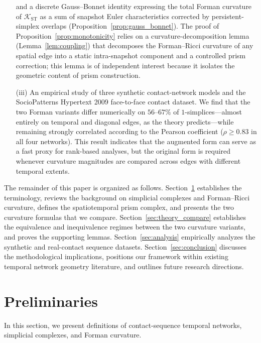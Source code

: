 \documentclass[
    pre,
    twocolumn,
    superscriptaddress,
    showpacs,
    nofootinbib,
    amsmath,
    amssymb,
    floatfix
]{revtex4-2}
\newcommand{\K}{\mathcal{K}}
\theoremstyle{plain} %
\theoremstyle{definition} %
\begin{document}
\begin{itemize}
      and a discrete Gauss--Bonnet identity expressing the total Forman curvature of $\K_{\mathrm{ST}}$ as a sum of snapshot Euler characteristics corrected by persistent-simplex overlaps (Proposition~\ref{prop:gauss_bonnet}).
      The proof of Proposition~\ref{prop:monotonicity} relies on a curvature-decomposition lemma (Lemma~\ref{lem:coupling}) that decomposes the Forman--Ricci curvature of any spatial edge into a static intra-snapshot component and a controlled prism correction; this lemma is of independent interest because it isolates the geometric content of prism construction.
\item[(iii)] An empirical study of three synthetic contact-network
      models and the SocioPatterns Hypertext 2009 face-to-face
      contact dataset.  We find that the two Forman variants differ
      numerically on $56$--$67\%$ of $1$-simplices---almost entirely
      on temporal and diagonal edges, as the theory predicts---while remaining strongly correlated according to the Pearson coefficient
      ($\rho\geq 0.83$ in all four networks).  This result indicates that
      the augmented form can serve as a fast proxy for rank-based
      analyses, but the original form is required whenever curvature magnitudes are compared across
      edges with different temporal extents.
\end{itemize}

The remainder of this paper is organized as follows.
Section~\ref{sec:prelim} establishes the terminology, reviews
the background on simplicial complexes and Forman--Ricci curvature,
defines the spatiotemporal prism complex, and presents the two
curvature formulas that we compare.
Section~\ref{sec:theory_compare} establishes the equivalence and
inequivalence regimes between the two curvature variants, and proves
the supporting lemmas.
Section~\ref{sec:analysis} empirically analyzes the
synthetic and real-contact sequence datasets.
Section~\ref{sec:conclusion} discusses the methodological implications, positions our framework within existing temporal network geometry literature, and outlines future research directions.


\section{Preliminaries}\label{sec:prelim}
In this section, we present definitions of contact-sequence temporal networks, simplicial complexes, and Forman curvature. 
\end{document}
